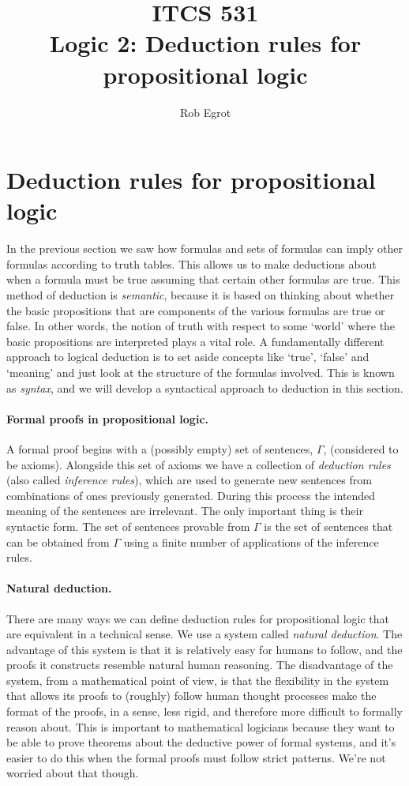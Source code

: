\documentclass{article}
\title{ITCS 531 \\Logic 2: Deduction rules for propositional logic}
\author{Rob Egrot}
\date{}
\theoremstyle{plain}
\begin{document}
\maketitle

\section{Deduction rules for propositional logic}\label{S:deduction}
In the previous section we saw how formulas and sets of formulas can imply other formulas according to truth tables. This allows us to make deductions about when a formula must be true assuming that certain other formulas are true. This method of deduction is \emph{semantic}, because it is based on thinking about whether the basic propositions that are components of the various formulas are true or false. In other words, the notion of truth with respect to some `world' where the basic propositions are interpreted plays a vital role. A fundamentally different approach to logical deduction is to set aside concepts like `true', `false' and `meaning' and just look at the structure of the formulas involved. This is known as \emph{syntax}, and we will develop a syntactical approach to deduction in this section. 
  
\paragraph{Formal proofs in propositional logic.} A formal proof begins with a (possibly empty) set of sentences, $\Gamma$, (considered to be axioms). Alongside this set of axioms we have a collection of \emph{deduction rules} (also called \emph{inference rules}), which are used to generate new sentences from combinations of ones previously generated. During this process the intended meaning of the sentences are irrelevant. The only important thing is their syntactic form. The set of sentences provable from $\Gamma$ is the set of sentences that can be obtained from $\Gamma$ using a finite number of applications of the inference rules.

\paragraph{Natural deduction.} There are many ways we can define deduction rules for propositional logic that are equivalent in a technical sense. We use a system called \emph{natural deduction}. The advantage of this system is that it is relatively easy for humans to follow, and the proofs it constructs resemble natural human reasoning. The disadvantage of the system, from a mathematical point of view, is that the flexibility in the system that allows its proofs to (roughly) follow human thought processes make the format of the proofs, in a sense, less rigid, and therefore more difficult to formally reason about. This is important to mathematical logicians because they want to be able to prove theorems about the deductive power of formal systems, and it's easier to do this when the formal proofs must follow strict patterns. We're not worried about that though.
\end{document}

